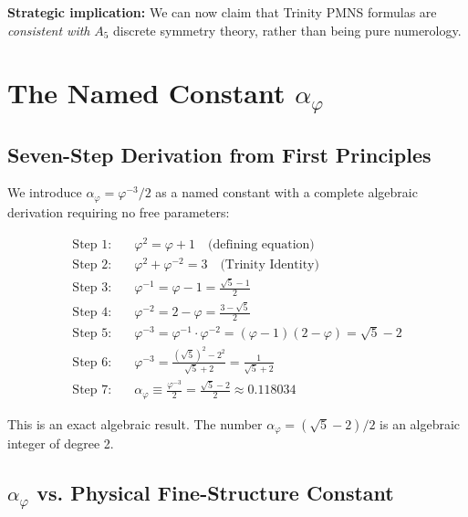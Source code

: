 \documentclass[10pt,a4paper]{article}
\begin{document}
\textbf{Strategic implication:} We can now claim that Trinity PMNS formulas are \emph{consistent with}
$A_5$ discrete symmetry theory, rather than being pure numerology.

\medskip

\section*{The Named Constant $\alpha_\varphi$}

\subsection*{Seven-Step Derivation from First Principles}

We introduce $\alpha_\varphi = \varphi^{-3}/2$ as a named constant with a complete algebraic
derivation requiring no free parameters:

\begin{align}
  \text{Step 1:} &\quad \varphi^2 = \varphi + 1 \quad \text{(defining equation)} \label{eq:s1}\\
  \text{Step 2:} &\quad \varphi^2 + \varphi^{-2} = 3 \quad \text{(Trinity Identity)} \label{eq:s2}\\
  \text{Step 3:} &\quad \varphi^{-1} = \varphi - 1 = \frac{\sqrt{5}-1}{2} \label{eq:s3}\\
  \text{Step 4:} &\quad \varphi^{-2} = 2 - \varphi = \frac{3-\sqrt{5}}{2} \label{eq:s4}\\
  \text{Step 5:} &\quad \varphi^{-3} = \varphi^{-1}\cdot\varphi^{-2}
                         = (\varphi-1)(2-\varphi) = \sqrt{5}-2 \label{eq:s5}\\
  \text{Step 6:} &\quad \varphi^{-3} = \frac{(\sqrt{5})^2 - 2^2}{\sqrt{5}+2}
                         = \frac{1}{\sqrt{5}+2} \label{eq:s6}\\
  \text{Step 7:} &\quad \alpha_\varphi \equiv \frac{\varphi^{-3}}{2}
                         = \frac{\sqrt{5}-2}{2} \approx 0.118034 \label{eq:alphaphi}
\end{align}

This is an exact algebraic result. The number $\alpha_\varphi = (\sqrt{5}-2)/2$ is an algebraic
integer of degree 2.

\subsection*{$\alpha_\varphi$ vs. Physical Fine-Structure Constant}
\end{document}
